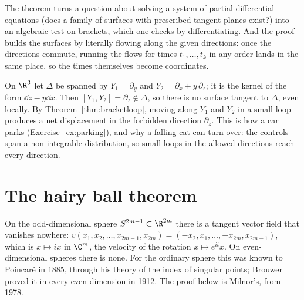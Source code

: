 \begin{beauty}
The theorem turns a question about solving a system of partial differential equations (does a family of surfaces with prescribed tangent planes exist?)
into an algebraic test on brackets, which one checks by differentiating. And the proof builds the surfaces by literally flowing along the given
directions: once the directions commute, running the flows for times $t_1,\dots,t_k$ in any order lands in the same place, so the times themselves
become coordinates.
\end{beauty}

\begin{example}\label{ex:contact}
On $\R^3$ let $\Delta$ be spanned by $Y_1=\partial_y$ and $Y_2=\partial_x+y\,\partial_z$; it is the kernel of the form $\dd z-y\dd x$. Then $[Y_1,Y_2]=\partial_z\notin\Delta$,
so there is no surface tangent to $\Delta$, even locally. By Theorem~\ref{thm:bracketloop}, moving along $Y_1$ and $Y_2$ in a small loop produces a net
displacement in the forbidden direction $\partial_z$. This is how a car parks (Exercise~\ref{ex:parking}), and why a falling cat can turn over: the
controls span a non-integrable distribution, so small loops in the allowed directions reach every direction.
\end{example}

\section{The hairy ball theorem}

On the odd-dimensional sphere $S^{2m-1}\subset\R^{2m}$ there is a tangent vector field that vanishes nowhere:
$v(x_1,x_2,\dots,x_{2m-1},x_{2m})=(-x_2,x_1,\dots,-x_{2m},x_{2m-1})$, which is $x\mapsto ix$ in $\C^m$, the velocity of the rotation
$x\mapsto e^{it}x$. On even-dimensional spheres there is none. For the ordinary sphere this was known to Poincaré in 1885, through his theory of the
index of singular points; Brouwer proved it in every even dimension in 1912. The proof below is Milnor's, from 1978.

